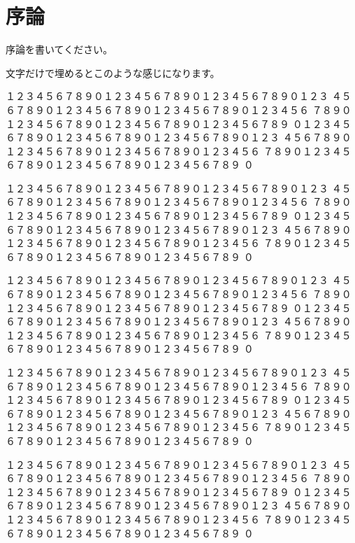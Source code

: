 \chapter{序論}

序論を書いてください。\newpage

文字だけで埋めるとこのような感じになります。

\noindent
１２３４５６７８９０１２３４５６７８９０１２３４５６７８９０１２３
４５６７８９０１２３４５６７８９０１２３４５６７８９０１２３４５６
７８９０１２３４５６７８９０１２３４５６７８９０１２３４５６７８９
０１２３４５６７８９０１２３４５６７８９０１２３４５６７８９０１２３
４５６７８９０１２３４５６７８９０１２３４５６７８９０１２３４５６
７８９０１２３４５６７８９０１２３４５６７８９０１２３４５６７８９
０

\noindent
１２３４５６７８９０１２３４５６７８９０１２３４５６７８９０１２３
４５６７８９０１２３４５６７８９０１２３４５６７８９０１２３４５６
７８９０１２３４５６７８９０１２３４５６７８９０１２３４５６７８９
０１２３４５６７８９０１２３４５６７８９０１２３４５６７８９０１２３
４５６７８９０１２３４５６７８９０１２３４５６７８９０１２３４５６
７８９０１２３４５６７８９０１２３４５６７８９０１２３４５６７８９
０

\noindent
１２３４５６７８９０１２３４５６７８９０１２３４５６７８９０１２３
４５６７８９０１２３４５６７８９０１２３４５６７８９０１２３４５６
７８９０１２３４５６７８９０１２３４５６７８９０１２３４５６７８９
０１２３４５６７８９０１２３４５６７８９０１２３４５６７８９０１２３
４５６７８９０１２３４５６７８９０１２３４５６７８９０１２３４５６
７８９０１２３４５６７８９０１２３４５６７８９０１２３４５６７８９
０

\noindent
１２３４５６７８９０１２３４５６７８９０１２３４５６７８９０１２３
４５６７８９０１２３４５６７８９０１２３４５６７８９０１２３４５６
７８９０１２３４５６７８９０１２３４５６７８９０１２３４５６７８９
０１２３４５６７８９０１２３４５６７８９０１２３４５６７８９０１２３
４５６７８９０１２３４５６７８９０１２３４５６７８９０１２３４５６
７８９０１２３４５６７８９０１２３４５６７８９０１２３４５６７８９
０

\noindent
１２３４５６７８９０１２３４５６７８９０１２３４５６７８９０１２３
４５６７８９０１２３４５６７８９０１２３４５６７８９０１２３４５６
７８９０１２３４５６７８９０１２３４５６７８９０１２３４５６７８９
０１２３４５６７８９０１２３４５６７８９０１２３４５６７８９０１２３
４５６７８９０１２３４５６７８９０１２３４５６７８９０１２３４５６
７８９０１２３４５６７８９０１２３４５６７８９０１２３４５６７８９
０

